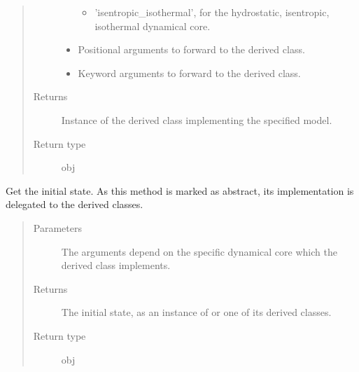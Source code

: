\documentclass[letterpaper,10pt,english]{sphinxmanual}
\begin{document}
\begin{fulllineitems}
\begin{fulllineitems}
\begin{quote}
\begin{description}
\begin{itemize}
\begin{itemize}
\item {} 
’isentropic\_isothermal’, for the hydrostatic, isentropic, isothermal dynamical core.

\end{itemize}


\item {} 
 \textendash{} Positional arguments to forward to the derived class.

\item {} 
 \textendash{} Keyword arguments to forward to the derived class.

\end{itemize}

\item[{Returns}] \leavevmode
Instance of the derived class implementing the specified model.

\item[{Return type}] \leavevmode
obj

\end{description}\end{quote}

\end{fulllineitems}


\begin{fulllineitems}
\label{\detokenize{api:dycore.dycore.DynamicalCore.get_initial_state}}
Get the initial state.
As this method is marked as abstract, its implementation is delegated to the derived classes.
\begin{quote}\begin{description}
\item[{Parameters}] \leavevmode
{} \textendash{} The arguments depend on the specific dynamical core which the derived class implements.

\item[{Returns}] \leavevmode
The initial state, as an instance of {\hyperref[\detokenize{api:storages.grid_data.GridData}]{}} or one of its derived classes.

\item[{Return type}] \leavevmode
obj

\end{description}\end{quote}


\end{fulllineitems}
\end{fulllineitems}
\end{document}
